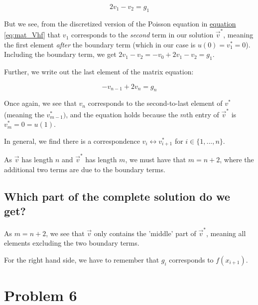 \documentclass[english,notitlepage]{article}  %
\begin{document}
    \begin{equation}
      2 v_1 - v_2 = g_1  \label{eqn:v_0}
    \end{equation}

    But we see, from the discretized version of the Poisson equation in \hyperref[eq:mat_Vhf]{equation \ref*{eq:mat_Vhf}} that $v_1$ corresponds to the \emph{second} term in our solution $\vec{v}^*$, meaning the first element \emph{after} the boundary term (which in our case is $u(0) = v^*_1 = 0$). Including the boundary term, we get $2 v_1 - v_2 = -v_{0} + 2 v_1 - v_2 = g_1 $.

    Further, we write out the last element of the matrix equation:

    \begin{equation}
      -v_{n-1} + 2 v_n = g_n \label{eqn:v_n}
    \end{equation}

    Once again, we see that $v_n$ corresponds to the second-to-last element of $v^*$ (meaning the $v^*_{m-1})$, and the equation holds because the $m$th entry of $\vec{v}^*$ is $v^*_m = 0 = u(1)$.


    In general, we find there is a correspondence $v_i \longleftrightarrow v^*_{i+1}$ for $i \in \{1, ..., n\}$.

    As $\vec{v}$ has length $n$ and $\vec{v}^*$ has length $m$, we must have that $m = n+2$, where the additional two terms are due to the boundary terms.


  \subsection*{Which part of the complete solution do we get?}

    As $m = n+2$, we see that $\vec{v}$ only contains the 'middle' part of $\vec{v}^*$, meaning all elements excluding the two boundary terms.

    For the right hand side, we have to remember that $g_i$ corresponds to $f(x_{i+1})$.

\section*{Problem 6}
\end{document}
